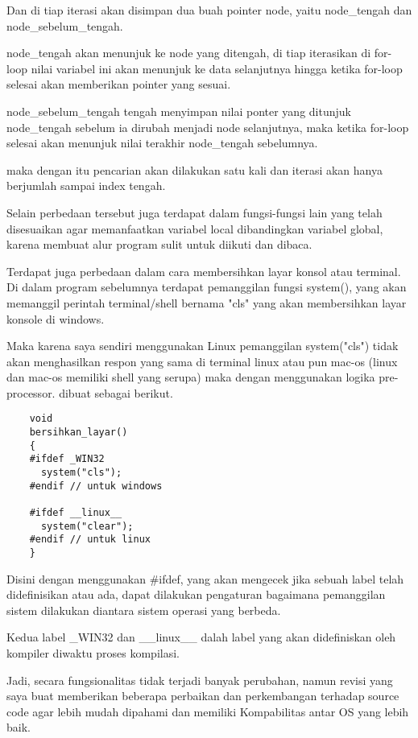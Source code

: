 \documentclass[12pt, a4paper]{article}
\begin{document}
  Dan di tiap iterasi akan disimpan dua buah pointer node, yaitu node\_tengah
  dan node\_sebelum\_tengah.

  node\_tengah akan menunjuk ke node yang ditengah, di tiap iterasikan di for-loop
  nilai variabel ini akan menunjuk ke data selanjutnya hingga ketika for-loop
  selesai akan memberikan pointer yang sesuai.

  node\_sebelum\_tengah tengah menyimpan nilai ponter yang ditunjuk node\_tengah
  sebelum ia dirubah menjadi node selanjutnya, maka ketika for-loop selesai akan
  menunjuk nilai terakhir node\_tengah sebelumnya.

  maka dengan itu pencarian akan dilakukan satu kali dan iterasi akan hanya berjumlah
  sampai index tengah.

  Selain perbedaan tersebut juga terdapat dalam fungsi-fungsi lain yang telah
  disesuaikan agar memanfaatkan variabel local dibandingkan variabel global, karena
  membuat alur program sulit untuk diikuti dan dibaca.

  Terdapat juga perbedaan dalam cara membersihkan layar konsol atau terminal. Di dalam
  program sebelumnya terdapat pemanggilan fungsi system(), yang akan memanggil perintah
  terminal/shell bernama "cls" yang akan membersihkan layar konsole di windows.

  Maka karena saya sendiri menggunakan Linux pemanggilan system("cls") tidak akan
  menghasilkan respon yang sama di terminal linux atau pun mac-os
  (linux dan mac-os memiliki shell yang serupa) maka dengan menggunakan logika pre-processor.
  dibuat sebagai berikut.

  \vspace{0.5cm}
  \begin{lstlisting}
    void
    bersihkan_layar()
    {
    #ifdef _WIN32
      system("cls");
    #endif // untuk windows

    #ifdef __linux__
      system("clear");
    #endif // untuk linux
    }
  \end{lstlisting}
  \vspace{0.5cm}

  Disini dengan menggunakan \#ifdef, yang akan mengecek jika sebuah label telah
  didefinisikan atau ada, dapat dilakukan pengaturan bagaimana pemanggilan
  sistem dilakukan diantara sistem operasi yang berbeda.

  Kedua label \_WIN32 dan \_\_linux\_\_ dalah label yang akan didefiniskan
  oleh kompiler diwaktu proses kompilasi.

  Jadi, secara fungsionalitas tidak terjadi banyak perubahan, namun revisi yang
  saya buat memberikan beberapa perbaikan dan perkembangan terhadap source code
  agar lebih mudah dipahami dan memiliki Kompabilitas antar OS yang lebih baik.
\end{document}
